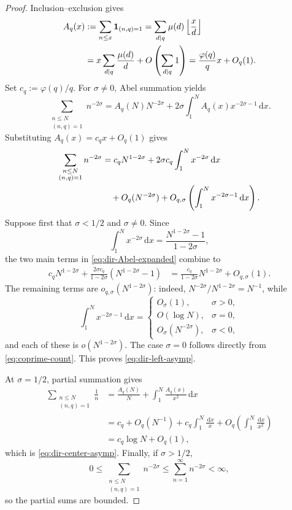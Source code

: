 \documentclass[11pt]{article}
\theoremstyle{definition}
\newcommand{\dd}{\,\mathrm d}
\newcommand{\1}{\mathbf 1}
\begin{document}
\begin{proof}
Inclusion--exclusion gives
\begin{align}
A_q(x)
&:=\sum_{n\le x}\mathbf 1_{(n,q)=1}
=\sum_{d\mid q}\mu(d)\left\lfloor\frac{x}{d}\right\rfloor\notag\\
&=x\sum_{d\mid q}\frac{\mu(d)}d+O\left(\sum_{d\mid q}1\right)
=\frac{\varphi(q)}q x+O_q(1).
\label{eq:coprime-count}
\end{align}
Set $c_q:=\varphi(q)/q$.  For $\sigma\neq0$, Abel summation yields
\begin{equation}\label{eq:abel-dir}
\sum_{\substack{n\le N\\(n,q)=1}}n^{-2\sigma}
=A_q(N)N^{-2\sigma}
+2\sigma\int_1^N A_q(x)x^{-2\sigma-1}\dd x.
\end{equation}
Substituting $A_q(x)=c_qx+O_q(1)$ gives
\begin{align}
\sum_{\substack{n\le N\\(n,q)=1}}n^{-2\sigma}
&=c_qN^{1-2\sigma}
+2\sigma c_q\int_1^Nx^{-2\sigma}\dd x\notag\\
&\quad+O_q(N^{-2\sigma})
+O_{q,\sigma}\left(\int_1^Nx^{-2\sigma-1}\dd x\right).
\label{eq:dir-Abel-expanded}
\end{align}
Suppose first that $\sigma<1/2$ and $\sigma\neq0$.  Since
\[
\int_1^Nx^{-2\sigma}\dd x
=\frac{N^{1-2\sigma}-1}{1-2\sigma},
\]
the two main terms in \eqref{eq:dir-Abel-expanded} combine to
\begin{align*}
c_qN^{1-2\sigma}
+\frac{2\sigma c_q}{1-2\sigma}(N^{1-2\sigma}-1)
&=\frac{c_q}{1-2\sigma}N^{1-2\sigma}
+O_{q,\sigma}(1).
\end{align*}
The remaining terms are $o_{q,\sigma}(N^{1-2\sigma})$: indeed, $N^{-2\sigma}/N^{1-2\sigma}=N^{-1}$, while
\[
\int_1^Nx^{-2\sigma-1}\dd x
=
\begin{cases}
O_\sigma(1),&\sigma>0,\\
O(\log N),&\sigma=0,\\
O_\sigma(N^{-2\sigma}),&\sigma<0,
\end{cases}
\]
and each of these is $o(N^{1-2\sigma})$.  The case $\sigma=0$ follows directly from \eqref{eq:coprime-count}.  This proves \eqref{eq:dir-left-asymp}.

At $\sigma=1/2$, partial summation gives
\begin{align*}
\sum_{\substack{n\le N\\(n,q)=1}}\frac1n
&=\frac{A_q(N)}N+\int_1^N\frac{A_q(x)}{x^2}\dd x\\
&=c_q+O_q(N^{-1})
+c_q\int_1^N\frac{\dd x}{x}
+O_q\left(\int_1^N\frac{\dd x}{x^2}\right)\\
&=c_q\log N+O_q(1),
\end{align*}
which is \eqref{eq:dir-center-asymp}.  Finally, if $\sigma>1/2$,
\[
0\le\sum_{\substack{n\le N\\(n,q)=1}}n^{-2\sigma}
\le\sum_{n=1}^{\infty}n^{-2\sigma}<\infty,
\]
so the partial sums are bounded.
\end{proof}
\end{document}
